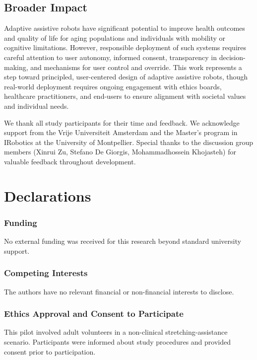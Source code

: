 \documentclass[pdflatex,sn-basic,Numbered,iicol,twocolumn]{sn-jnl}%
\begin{document}
\subsection{Broader Impact}

Adaptive assistive robots have significant potential to improve health outcomes and quality of life for aging populations and individuals with mobility or cognitive limitations. However, responsible deployment of such systems requires careful attention to user autonomy, informed consent, transparency in decision-making, and mechanisms for user control and override. This work represents a step toward principled, user-centered design of adaptive assistive robots, though real-world deployment requires ongoing engagement with ethics boards, healthcare practitioners, and end-users to ensure alignment with societal values and individual needs.

\backmatter


We thank all study participants for their time and feedback. We acknowledge support from the Vrije Universiteit Amsterdam and the Master's program in IRobotics at the University of Montpellier. Special thanks to the discussion group members (Xinrui Zu, Stefano De Giorgis, Mohammadhossein Khojasteh) for valuable feedback throughout development.

\section*{Declarations}

\subsubsection*{Funding} No external funding was received for this research beyond standard university support.

\subsubsection*{Competing Interests} The authors have no relevant financial or non-financial interests to disclose.

\subsubsection*{Ethics Approval and Consent to Participate} This pilot involved adult volunteers in a non-clinical stretching-assistance scenario. Participants were informed about study procedures and provided consent prior to participation.
\end{document}

